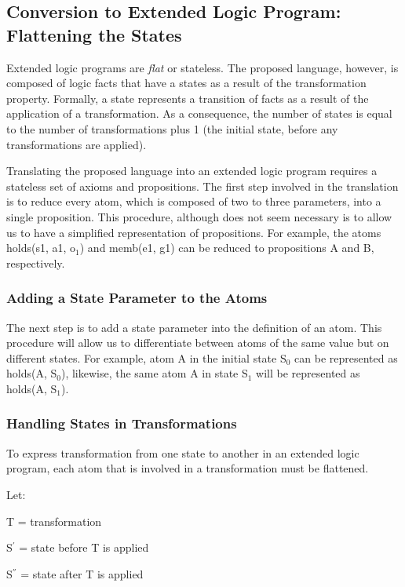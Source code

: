 \documentclass[a4paper,draft]{article}
\begin{document}
    \subsection{Conversion to Extended Logic Program: Flattening the States}

      Extended logic programs are \emph{flat} or stateless. The proposed
      language, however, is composed of logic facts that have a states as
      a result of the transformation property. Formally, a state represents
      a transition of facts as a result of the application of a transformation.
      As a consequence, the number of states is equal to the number of
      transformations plus 1 (the initial state, before any transformations
      are applied).

      Translating the proposed language into an extended logic program requires
      a stateless set of axioms and propositions. The first step involved in
      the translation is to reduce every atom, which is composed of two to
      three parameters, into a single proposition. This procedure, although
      does not seem necessary is to allow us to have a simplified
      representation of propositions. For example, the atoms holds(s1, a1, 
      o$_{1}$) and memb(e1, g1) can be reduced to propositions A and B,
      respectively.

      \subsubsection{Adding a State Parameter to the Atoms}

        The next step is to add a state parameter into the definition of an
        atom. This procedure will allow us to differentiate between atoms of
        the same value but on different states. For example, atom A in 
        the initial state S$_0$ can be represented as holds(A, S$_0$),
        likewise, the same atom A in state S$_1$ will be represented as
        holds(A, S$_1$).

      \subsubsection{Handling States in Transformations}

        To express transformation from one state to another in an extended
        logic program, each atom that is involved in a transformation must
        be flattened.

        Let:
  
        \begin{list}{}{}
          \item T = transformation
          \item S$^{'}$ = state before T is applied
          \item S$^{''}$ = state after T is applied
        \end{list}
  
\end{document}
